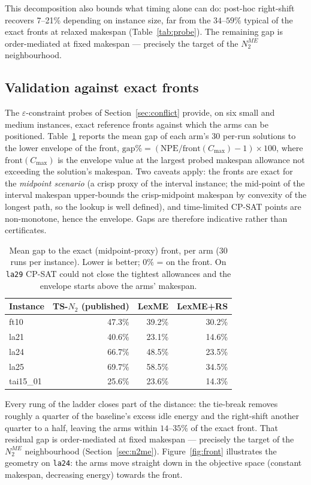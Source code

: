 \documentclass[preprint,12pt]{elsarticle}
\newcommand{\Cmax}{C_{\max}}
\newcommand{\NPE}{\mathrm{NPE}}
\begin{document}
This decomposition also bounds what timing alone can do: post-hoc
right-shift recovers 7--21\% depending on instance size, far from the
$34$--$59\%$ typical of the exact fronts at relaxed makespan
(Table~\ref{tab:probe}). The remaining gap is order-mediated at fixed
makespan --- precisely the target of the $N_2^{ME}$ neighbourhood.

\subsection{Validation against exact fronts}
\label{sec:exp-exact}

The $\varepsilon$-constraint probes of Section~\ref{sec:conflict} provide,
on six small and medium instances, exact reference fronts against which
the arms can be positioned. Table~\ref{tab:front} reports the mean gap of
each arm's 30 per-run solutions to the lower envelope of the front,
$\text{gap}\%=(\NPE/\text{front}(\Cmax)-1)\times 100$, where
$\text{front}(\Cmax)$ is the envelope value at the largest probed makespan
allowance not exceeding the solution's makespan. Two caveats apply: the
fronts are exact for the \emph{midpoint scenario} (a crisp proxy of the
interval instance; the mid-point of the interval makespan upper-bounds the
crisp-midpoint makespan by convexity of the longest path, so the lookup is
well defined), and time-limited CP-SAT points are non-monotone, hence the
envelope. Gaps are therefore indicative rather than certificates.

\begin{table}[htb]
\centering\small
\caption{Mean gap to the exact (midpoint-proxy) front, per arm
(30 runs per instance). Lower is better; $0\%$ = on the front. On
\texttt{la29} CP-SAT could not close the tightest allowances and the
envelope starts above the arms' makespan.}
\label{tab:front}
\begin{tabular}{l rrr}
\toprule
Instance & TS-$N_2$ (published) & LexME & LexME+RS \\
\midrule
ft10 & 47.3\% & 39.2\% & 30.2\% \\
la21 & 40.6\% & 23.1\% & 14.6\% \\
la24 & 66.7\% & 48.5\% & 23.5\% \\
la25 & 69.7\% & 58.5\% & 34.5\% \\
tai15\_01 & 25.6\% & 23.6\% & 14.3\% \\
\bottomrule
\end{tabular}
\end{table}

Every rung of the ladder closes part of the distance: the tie-break
removes roughly a quarter of the baseline's excess idle energy and the
right-shift another quarter to a half, leaving the arms within
$14$--$35\%$ of the exact front. That residual gap is order-mediated at
fixed makespan --- precisely the target of the $N_2^{ME}$ neighbourhood
(Section~\ref{sec:n2me}). Figure~\ref{fig:front} illustrates the geometry
on \texttt{la24}: the arms move straight down in the objective space
(constant makespan, decreasing energy) towards the front.
\end{document}
